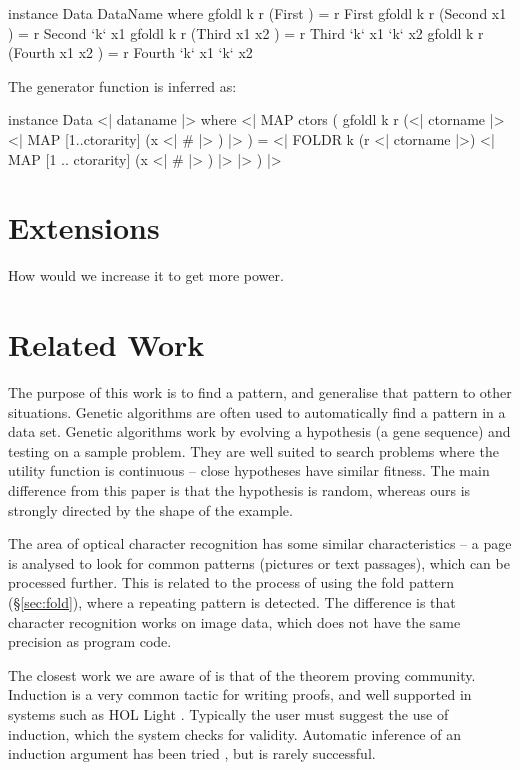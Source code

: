 \documentclass[preprint]{sigplanconf}
\begin{document}
\begin{code}
\begin{code}
instance Data DataName where
    gfoldl k r (First          ) = r First
    gfoldl k r (Second  x1     ) = r Second  `k` x1
    gfoldl k r (Third   x1 x2  ) = r Third   `k` x1 `k` x2
    gfoldl k r (Fourth  x1 x2  ) = r Fourth  `k` x1 `k` x2
\end{code}

\noindent The generator function is inferred as:

\begin{code}
instance Data \? <| dataname |> where
    <| MAP ctors (
        gfoldl k r
            (<| ctorname |> \? <| MAP [1..ctorarity] (x <| # |> ) |> ) =
            <| FOLDR k (r \? <| ctorname |>)
                <| MAP [1 .. ctorarity] (x <| # |> ) |>
            |>
    ) |>
\end{code}

\section{Extensions}

How would we increase it to get more power.

\section{Related Work}
\label{sec:related}

The purpose of this work is to find a pattern, and generalise that pattern to other situations. Genetic algorithms \cite{genetic_algorithms} are often used to automatically find a pattern in a data set. Genetic algorithms work by evolving a hypothesis (a gene sequence) and testing on a sample problem. They are well suited to search problems where the utility function is continuous -- close hypotheses have similar fitness. The main difference from this paper is that the hypothesis is random, whereas ours is strongly directed by the shape of the example.

The area of optical character recognition \cite{ocr} has some similar characteristics -- a page is analysed to look for common patterns (pictures or text passages), which can be processed further. This is related to the process of using the fold pattern (\S\ref{sec:fold}), where a repeating pattern is detected. The difference is that character recognition works on image data, which does not have the same precision as program code.

The closest work we are aware of is that of the theorem proving community. Induction is a very common tactic for writing proofs, and well supported in systems such as HOL Light \cite{hol_light}. Typically the user must suggest the use of induction, which the system checks for validity. Automatic inference of an induction argument has been tried \cite{mintchev:reasoning}, but is rarely successful.


\end{code}
\end{document}
